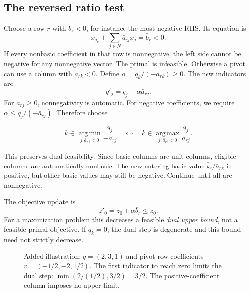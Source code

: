 \documentclass[11pt,a4paper]{article}
\begin{document}
\subsection{The reversed ratio test}\label{sec:dual-ratio}
Choose a row $r$ with $\bar b_r<0$, for instance the most negative RHS.
Its equation is
\[
  x_{j_r}+\sum_{j\in N}\bar a_{rj}x_j=\bar b_r<0.
\]
If every nonbasic coefficient in that row is nonnegative, the left side cannot
be negative for any nonnegative vector. The primal is infeasible.
Otherwise a pivot can use a column with $\bar a_{rk}<0$.
Define $\alpha=q_k/(-\bar a_{rk})\geq0$. The new indicators are
\[
  q'_j=q_j+\alpha\bar a_{rj}.
\]
For $\bar a_{rj}\geq0$, nonnegativity is automatic. For negative coefficients,
we require $\alpha\leq q_j/(-\bar a_{rj})$. Therefore choose
\begin{lecturecore}
  \begin{equation}\label{eq:dual-ratio}
    k\in\operatorname*{arg\,min}_{j:\bar a_{rj}<0}
    \frac{q_j}{-\bar a_{rj}}
    \quad\Longleftrightarrow\quad
    k\in\operatorname*{arg\,max}_{j:\bar a_{rj}<0}
    \frac{q_j}{\bar a_{rj}}.
  \end{equation}
\end{lecturecore}
This preserves dual feasibility. Since basic columns are unit columns, eligible
columns are automatically nonbasic. The new entering basic value
$\bar b_r/\bar a_{rk}$ is positive, but other basic values may still be negative.
Continue until all are nonnegative.

The objective update is
\[
  z'_0=z_0+\alpha\bar b_r\leq z_0.
\]
For a maximization problem this decreases a feasible \emph{dual upper bound},
not a feasible primal objective. If $q_k=0$, the dual step is degenerate and
this bound need not strictly decrease.

\begin{figure}[H]
  \centering
  \caption{Added illustration: $q=(2,3,1)$ and pivot-row coefficients
    $v=(-1/2,-2,1/2)$. The first indicator to reach zero limits the dual step:
    $\min(2/(1/2),3/2)=3/2$. The positive-coefficient column imposes no upper limit.}
\end{figure}
\end{document}
